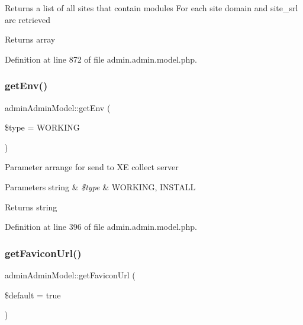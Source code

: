 Returns a list of all sites that contain modules For each site domain and site\+\_\+srl are retrieved

\begin{DoxyReturn}{Returns}
array 
\end{DoxyReturn}


Definition at line 872 of file admin.\+admin.\+model.\+php.

\hypertarget{classadminAdminModel_aae89799bb4f84379b6adb15a01dd6c8b}{}\label{classadminAdminModel_aae89799bb4f84379b6adb15a01dd6c8b} 
\subsubsection{\texorpdfstring{get\+Env()}{getEnv()}}
{\footnotesize\ttfamily admin\+Admin\+Model\+::get\+Env (\begin{DoxyParamCaption}\item[{}]{\$type = {\ttfamily \textquotesingle{}WORKING\textquotesingle{}} }\end{DoxyParamCaption})}

Parameter arrange for send to XE collect server 
\begin{DoxyParams}[1]{Parameters}
string & {\em \$type} & \textquotesingle{}W\+O\+R\+K\+I\+NG\textquotesingle{}, \textquotesingle{}I\+N\+S\+T\+A\+LL\textquotesingle{} \\
\hline
\end{DoxyParams}
\begin{DoxyReturn}{Returns}
string 
\end{DoxyReturn}


Definition at line 396 of file admin.\+admin.\+model.\+php.

\hypertarget{classadminAdminModel_a94cadc80816d875f0713507d356c422b}{}\label{classadminAdminModel_a94cadc80816d875f0713507d356c422b} 
\subsubsection{\texorpdfstring{get\+Favicon\+Url()}{getFaviconUrl()}}
{\footnotesize\ttfamily admin\+Admin\+Model\+::get\+Favicon\+Url (\begin{DoxyParamCaption}\item[{}]{\$default = {\ttfamily true} }\end{DoxyParamCaption})}



